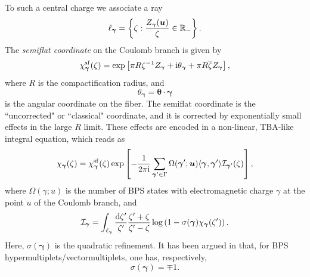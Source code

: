 \documentclass[a4paper,11pt]{article}
\theoremstyle{definition}
\newcommand{\CI}{{\cal I}}
\def\IR{{\mathbb R}}
\newcommand{\re}{{\rm e}}
\newcommand{\ri}{{\rm i}}
\newcommand{\rd}{{\rm d}}
\newcommand{\bs}{\boldsymbol}
\def\IR{\mathbb{R}}
\begin{document}
To such a central charge we associate a ray
%
\begin{equation}
  \ell_{\bs{\gamma}}= \left\{ \zeta: {Z_{\bs{\gamma}}(\bs{u}) \over
      \zeta} \in \IR_-\right\}.  
\end{equation}
%
%
%
The {\it semiflat coordinate} on the Coulomb branch is given by
%
\begin{equation}
\chi_{\bs{\gamma}}^{\rm sf}(\zeta)= \exp\left[ \pi R \zeta^{-1}
  Z_{\bs{\gamma}} + \ri \theta_{\bs{\gamma}} + \pi R \overline \zeta
  Z_{\bs{\gamma}} \right],  
\end{equation}
%
where $R$ is the compactification radius, and 
%
\begin{equation}
 \theta_{\bs{\gamma}}= \boldsymbol{\theta} \cdot {\bs{\gamma}}
 \end{equation}
 is the angular coordinate on the fiber.  The semiflat coordinate is
 the ``uncorrected" or ``classical" coordinate, and it is corrected by
 exponentially small effects in the large $R$ limit. These
 effects are encoded in a non-linear, TBA-like integral equation,
 which reads as
%
\begin{equation}
\label{tba-equation}
\chi_{\bs{\gamma}}(\zeta)=\chi_{\bs{\gamma}}^{\rm sf}(\zeta)\exp\left[
  -{1\over2 \pi \ri} \sum_{\bs{\gamma}' \in \Gamma}  
\Omega(\bs{\gamma}'; \bs{u}) \langle \bs{\gamma}, \bs{\gamma}'\rangle
\CI_{\bs{\gamma}'} (\zeta) \right],  
\end{equation}
%
where $\Omega(\gamma;u)$ is the number of BPS states with
electromagnetic charge $\gamma$ at the point $u$ of the Coulomb branch, and
%
\begin{equation}
  \CI_{\bs{\gamma}}= \int_{\ell_{\bs{\gamma}}} {\rd \zeta' \over
    \zeta'} {\zeta '+\zeta \over \zeta'- \zeta} \log\left(1-
    \sigma(\bs{\gamma}) \chi_{\bs{\gamma}} (\zeta') \right).  
\end{equation}
%
Here, $\sigma(\bs{\gamma})$ is the quadratic refinement. It has been
argued in \cite{gmn2} that, for BPS hypermultiplets/vectormultiplets,
one has, respectively,
%
\begin{equation}
  \sigma(\bs{\gamma})=\mp 1. 
\end{equation}
%
%
\end{document}
